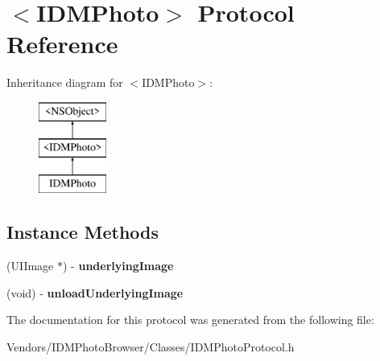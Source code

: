 \hypertarget{protocol_i_d_m_photo-p}{}\section{$<$I\+D\+M\+Photo$>$ Protocol Reference}
\label{protocol_i_d_m_photo-p}
Inheritance diagram for $<$I\+D\+M\+Photo$>$\+:\begin{figure}[H]
\begin{center}
\leavevmode
\includegraphics[height=3.000000cm]{protocol_i_d_m_photo-p}
\end{center}
\end{figure}
\subsection*{Instance Methods}
\begin{DoxyCompactItemize}
\item 
\hypertarget{protocol_i_d_m_photo-p_a1e772bbb8a7afe08b8670dc27d5796b4}{}(U\+I\+Image $\ast$) -\/ {\bfseries underlying\+Image}\label{protocol_i_d_m_photo-p_a1e772bbb8a7afe08b8670dc27d5796b4}

\item 
\hypertarget{protocol_i_d_m_photo-p_a57cb46cb8a9868bdc77747b39d578e2a}{}(void) -\/ {\bfseries unload\+Underlying\+Image}\label{protocol_i_d_m_photo-p_a57cb46cb8a9868bdc77747b39d578e2a}

\end{DoxyCompactItemize}


The documentation for this protocol was generated from the following file\+:\begin{DoxyCompactItemize}
\item 
Vendors/\+I\+D\+M\+Photo\+Browser/\+Classes/I\+D\+M\+Photo\+Protocol.\+h\end{DoxyCompactItemize}

